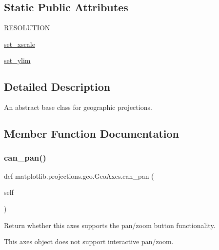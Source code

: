 \subsection*{Static Public Attributes}
\begin{DoxyCompactItemize}
\item 
\hyperlink{classmatplotlib_1_1projections_1_1geo_1_1GeoAxes_a412547e51b1b9349fe2507863f3d3bef}{R\+E\+S\+O\+L\+U\+T\+I\+ON}
\item 
\hyperlink{classmatplotlib_1_1projections_1_1geo_1_1GeoAxes_a30b74ca3a537418af561e0f6734ac91a}{set\+\_\+xscale}
\item 
\hyperlink{classmatplotlib_1_1projections_1_1geo_1_1GeoAxes_a88bb31004a65871342767a5bfc33485a}{set\+\_\+ylim}
\end{DoxyCompactItemize}


\subsection{Detailed Description}
\begin{DoxyVerb}An abstract base class for geographic projections.\end{DoxyVerb}
 

\subsection{Member Function Documentation}
\mbox{\label{classmatplotlib_1_1projections_1_1geo_1_1GeoAxes_a32110f4baabfeefadf46c1c4b0808a9d}} 
\subsubsection{\texorpdfstring{can\+\_\+pan()}{can\_pan()}}
{\footnotesize\ttfamily def matplotlib.\+projections.\+geo.\+Geo\+Axes.\+can\+\_\+pan (\begin{DoxyParamCaption}\item[{}]{self }\end{DoxyParamCaption})}

\begin{DoxyVerb}Return whether this axes supports the pan/zoom button functionality.

This axes object does not support interactive pan/zoom.
\end{DoxyVerb}
 \mbox{\label{classmatplotlib_1_1projections_1_1geo_1_1GeoAxes_ae7d86cc5bfbcffe6498c3658d27fa81d}} 
